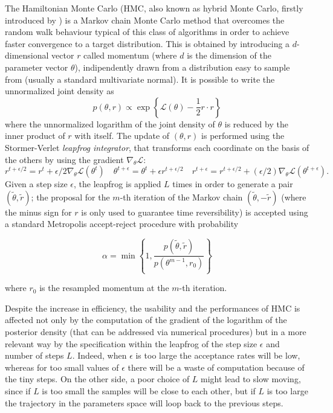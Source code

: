 \documentclass{article}
\begin{document}
The Hamiltonian Monte Carlo (HMC, also known as hybrid Monte Carlo, firstly introduced by \citealp{duane1987hybrid}) is a Markov chain Monte Carlo method that overcomes the random walk behaviour typical of this class of algorithms in order to achieve faster convergence to a target distribution.
This is obtained by introducing a $d$-dimensional vector $r$ called momentum (where $d$ is the dimension of the parameter vector $\theta$), indipendently drawn from a distribution easy to sample from (usually a standard multivariate normal). It is possible to write the unnormalized joint density as
$$ p(\theta,r) \propto \exp\left\{\mathcal{L}(\theta)-\frac{1}{2} r \cdot r\right\} $$
where the unnormalized logarithm of the joint density of $\theta$ is reduced by the inner product of $r$ with itself. The update of $(\theta,r)$ is performed using the Stormer-Verlet \textit{leapfrog integrator}, that transforms each coordinate on the basis of the others by using the gradient $\nabla_{\theta}\mathcal{L}$:
\begin{equation*}
r^{t+\epsilon/2}=r^t+\epsilon/2 \nabla_{\theta}\mathcal{L}(\theta^t)
\quad \theta^{t+\epsilon} = \theta^t+\epsilon r^{t+\epsilon/2} \quad
r^{t+\epsilon}=r^{t+\epsilon/2}+(\epsilon/2)\nabla_{\theta}\mathcal{L}(\theta^{t+\epsilon}).
\end{equation*}
Given a step size $\epsilon$, the leapfrog is applied $L$ times in order to generate a pair $(\tilde{\theta},\tilde{r})$; the proposal for the $m$-th iteration of the Markov chain $(\tilde{\theta},-\tilde{r})$ (where the minus sign for $r$ is only used to guarantee time reversibility) is accepted using a standard Metropolis accept-reject procedure with probability

\begin{equation*}
\alpha=\min\left\{1,\frac{p(\tilde{\theta},\tilde{r})}{p(\theta^{m-1},r_0)}\right\}
\end{equation*}

where $r_0$ is the resampled momentum at the $m$-th iteration.

Despite the increase in efficiency, the usability and the performances of HMC is affected not only by the computation of the gradient of the logarithm of the posterior density (that can be addressed via numerical procedures) but in a more relevant way by the specification within the leapfrog of the step size $\epsilon$ and number of steps $L$. Indeed, when $\epsilon$ is too large the acceptance rates will be low, whereas for too small values of $\epsilon$ there will be a waste of computation because of the tiny steps. On the other side, a poor choice of $L$ might lead to slow moving, since if $L$ is too small the samples will be close to each other, but if $L$ is too large the trajectory in the parameters space will loop back to the previous steps.
\end{document}
